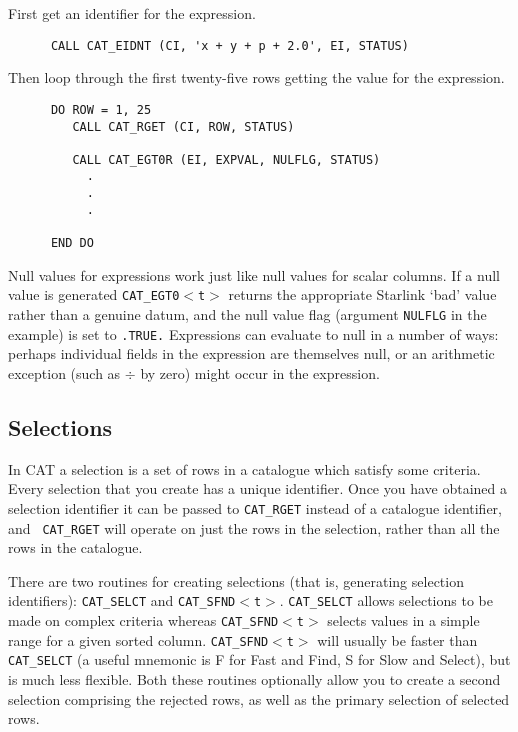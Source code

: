 First get an identifier for the expression.

\begin{verbatim}
      CALL CAT_EIDNT (CI, 'x + y + p + 2.0', EI, STATUS)
\end{verbatim}

Then loop through the first twenty-five rows getting the value for the
expression.

\begin{verbatim}
      DO ROW = 1, 25
         CALL CAT_RGET (CI, ROW, STATUS)

         CALL CAT_EGT0R (EI, EXPVAL, NULFLG, STATUS)
           .
           .
           .

      END DO
\end{verbatim}

Null values for expressions work just like null values for scalar
columns. If a null value is generated {\tt CAT\_EGT0$<$t$>$} returns
the appropriate Starlink `bad' value rather than a genuine datum, and
the null value flag (argument {\tt NULFLG} in the example) is set to
{\tt .TRUE.} Expressions can evaluate to null in a number of ways:
perhaps individual fields in the expression are themselves null, or
an arithmetic exception (such as $\div$ by zero) might occur in the
expression.


\subsection{Selections}

In CAT a selection is a set of rows in a catalogue which satisfy some
criteria. Every selection that you create has a unique identifier.
Once you have obtained a selection identifier it can be passed to
{\tt CAT\_RGET} instead of a catalogue identifier, and {\tt
CAT\_RGET} will operate on just the rows in the selection, rather than
all the rows in the catalogue.

There are two routines for creating selections (that is, generating
selection identifiers): {\tt CAT\_SELCT} and {\tt CAT\_SFND$<$t$>$}.
{\tt CAT\_SELCT} allows selections to be made on complex criteria
whereas {\tt CAT\_SFND$<$t$>$} selects values in a simple range for a
given sorted column. {\tt CAT\_SFND$<$t$>$} will usually be faster than
{\tt CAT\_SELCT} (a useful mnemonic is F for Fast and Find, S for Slow
and Select), but is much less flexible. Both these routines optionally
allow you to create a second selection comprising the rejected rows,
as well as the primary selection of selected rows.

